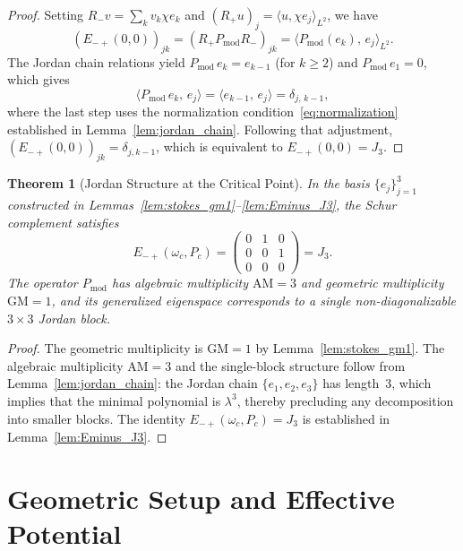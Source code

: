 \documentclass[12pt,a4paper]{amsart}
\newtheorem{theorem}{Theorem}[section]
\theoremstyle{remark}
\begin{document}
\begin{proof}
Setting $R_-v = \sum_k v_k \chi e_k$ and $(R_+u)_j = \langle u, \chi e_j\rangle_{L^2}$, we have
\[
  (E_{-+}(0,0))_{jk}
  = (R_+ P_{\mathrm{mod}} R_-)_{jk}
  = \langle P_{\mathrm{mod}}(e_k),\, e_j \rangle_{L^2}.
\]
The Jordan chain relations yield $P_{\mathrm{mod}}\,e_k = e_{k-1}$ (for $k \geq 2$)
and $P_{\mathrm{mod}}\,e_1 = 0$, which gives
\[
  \langle P_{\mathrm{mod}}\,e_k,\, e_j \rangle
  = \langle e_{k-1},\, e_j \rangle
  = \delta_{j,\,k-1},
\]
where the last step uses the normalization condition~\eqref{eq:normalization} established
in Lemma~\ref{lem:jordan_chain}.
Following that adjustment, $(E_{-+}(0,0))_{jk} = \delta_{j,k-1}$, which is equivalent to
$E_{-+}(0,0) = J_3$.
\end{proof}

\begin{theorem}[Jordan Structure at the Critical Point]
\label{thm:jordan}
In the basis $\{e_j\}_{j=1}^3$ constructed in Lemmas~\ref{lem:stokes_gm1}--\ref{lem:Eminus_J3},
the Schur complement satisfies
\[
  E_{-+}(\omega_c, P_c) =
  \begin{pmatrix} 0 & 1 & 0 \\ 0 & 0 & 1 \\ 0 & 0 & 0 \end{pmatrix} = J_3.
\]
The operator $P_{\mathrm{mod}}$ has algebraic multiplicity $\mathrm{AM} = 3$ and
geometric multiplicity $\mathrm{GM} = 1$, and its generalized eigenspace corresponds
to a single non-diagonalizable $3\times 3$ Jordan block.
\end{theorem}

\begin{proof}
The geometric multiplicity is $\mathrm{GM} = 1$ by Lemma~\ref{lem:stokes_gm1}.
The algebraic multiplicity $\mathrm{AM} = 3$ and the single-block structure follow from
Lemma~\ref{lem:jordan_chain}: the Jordan chain $\{e_1,e_2,e_3\}$ has length~3,
which implies that the minimal polynomial is $\lambda^3$, thereby precluding any decomposition into
smaller blocks. The identity $E_{-+}(\omega_c,P_c) = J_3$ is established in Lemma~\ref{lem:Eminus_J3}.
\end{proof}

\section{Geometric Setup and Effective Potential}
\end{document}

